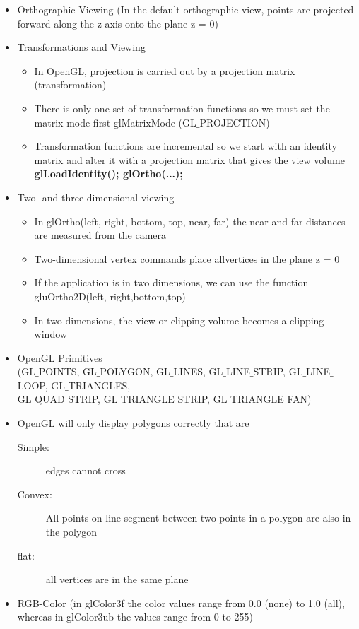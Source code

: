 \documentclass[11pt,a4paper]{article}
\begin{document}
\begin{itemize}
			\item Orthographic Viewing (In the default orthographic view, points are projected forward along the z axis onto the plane z = 0)
			\item Transformations and Viewing
				\begin{itemize}
					\item In OpenGL, projection is carried out by a projection matrix (transformation)	
					\item There is only one set of transformation functions so we must set the matrix mode first glMatrixMode (GL$\_$PROJECTION)	
					\item Transformation functions are incremental so we start with	an identity matrix and alter it with a projection matrix that gives the view volume \textbf{glLoadIdentity(); glOrtho(...);}
				\end{itemize}
			\item Two- and three-dimensional viewing
				\begin{itemize}
					\item In glOrtho(left, right, bottom, top, near, far) the near and far distances are measured from the camera	
					\item Two-dimensional vertex commands place allvertices in the plane z = 0	
					\item If the application is in two dimensions, we can use the function gluOrtho2D(left, right,bottom,top)	
					\item In two dimensions, the view or clipping volume becomes a clipping window
				\end{itemize}
			\item OpenGL Primitives\\
			(GL$\_$POINTS,
			GL$\_$POLYGON,
			GL$\_$LINES,
			GL$\_$LINE$\_$STRIP,
			GL$\_$LINE$\_$LOOP,
			GL$\_$TRIANGLES,\\
			GL$\_$QUAD$\_$STRIP,
			GL$\_$TRIANGLE$\_$STRIP,
			GL$\_$TRIANGLE$\_$FAN)
			\item OpenGL will only display polygons correctly that are	
				\begin{description}
					\item[Simple:] edges cannot cross
					\item[Convex:] All points on line segment between two points in a polygon are also in the polygon	
					\item[flat:] all vertices are in the same plane
				\end{description}
			\item RGB-Color (in glColor3f the color values range from 0.0 (none) to 1.0 (all), whereas in glColor3ub the values range from 0 to 255)

\end{itemize}
\end{document}
